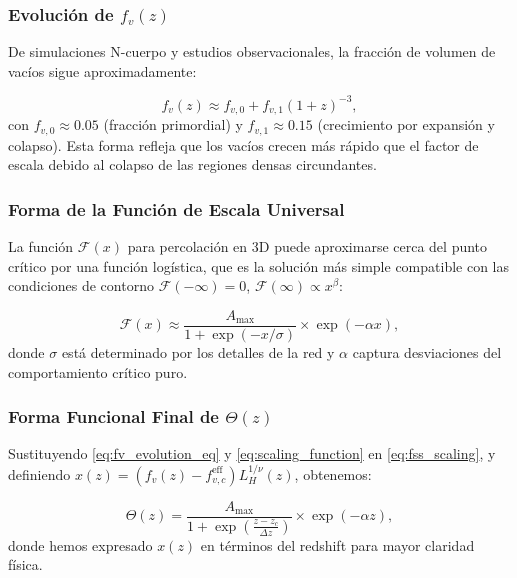 \documentclass[12pt, a4paper]{article}
\theoremstyle{plain}
\theoremstyle{definition}
\begin{document}
\subsubsection{Evolución de $f_v(z)$}

De simulaciones N-cuerpo y estudios observacionales, la fracción de volumen de vacíos sigue aproximadamente:

\begin{equation}
f_v(z) \approx f_{v,0} + f_{v,1} (1+z)^{-3},
\label{eq:fv_evolution_eq}
\end{equation}
con $f_{v,0} \approx 0.05$ (fracción primordial) y $f_{v,1} \approx 0.15$ (crecimiento por expansión y colapso). Esta forma refleja que los vacíos crecen más rápido que el factor de escala debido al colapso de las regiones densas circundantes.

\subsubsection{Forma de la Función de Escala Universal}

La función $\mathcal{F}(x)$ para percolación en 3D puede aproximarse cerca del punto crítico por una función logística, que es la solución más simple compatible con las condiciones de contorno $\mathcal{F}(-\infty)=0$, $\mathcal{F}(\infty)\propto x^\beta$:

\begin{equation}
\mathcal{F}(x) \approx \frac{A_{\max}}{1 + \exp(-x/\sigma)} \times \exp(-\alpha x),
\label{eq:scaling_function}
\end{equation}
donde $\sigma$ está determinado por los detalles de la red y $\alpha$ captura desviaciones del comportamiento crítico puro.

\subsubsection{Forma Funcional Final de $\Theta(z)$}

Sustituyendo \eqref{eq:fv_evolution_eq} y \eqref{eq:scaling_function} en \eqref{eq:fss_scaling}, y definiendo $x(z) = (f_v(z) - f_{v,c}^{\text{eff}}) L_H^{1/\nu}(z)$, obtenemos:

\begin{equation}
\Theta(z) = \frac{A_{\max}}{1 + \exp\left(\frac{z - z_c}{\Delta z}\right)} \times \exp(-\alpha z),
\label{eq:theta_final}
\end{equation}
donde hemos expresado $x(z)$ en términos del redshift para mayor claridad física.
\end{document}
